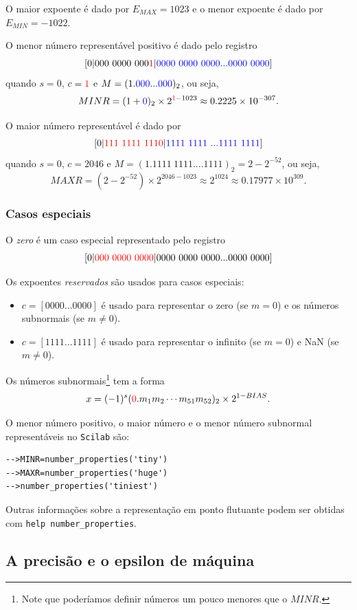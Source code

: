 O maior expoente é dado por $E_{MAX}=1023$ e o menor expoente é dado por $E_{MIN}=-1022$.



O menor número representável positivo é dado pelo registro
$$
[0|000~0000~000{\color{red}{1}} |{\color{blue}{0000~0000~0000...0000~0000}}]
$$
quando $s=0$, $c={\color{red}{1}}$ e $M=(1.{\color{blue}{000...000}})_2$, ou seja,
$$
MINR=(1+{\color{blue}{0}})_2\times 2^{{\color{red}{1}}-1023} \approx 0.2225\times 10^{-307}.
$$

O maior número representável é dado por
$$
[0|{\color{red}{111~1111~1110}} |{\color{blue}{1111~1111~...1111~1111}}]
$$
quando $s=0$, $c=2046$ e $M=(1.1111~1111....1111)_2=2-2^{-52}$, ou seja,
$$
MAXR=(2-2^{-52})\times 2^{2046-1023} \approx 2^{1024}\approx0.17977\times 10^{309}.
$$


\subsubsection{Casos especiais}
O \emph{zero} é um caso especial representado pelo registro 
$$
[0|{\color{red}{000~0000~0000}} |0000~0000~0000...0000~0000]
$$




Os expoentes \emph{reservados} são usados para casos especiais:
\begin{itemize}
 \item $c=[0000...0000]$ é usado para representar o zero (se $m=0$) e os números subnormais (se $m\neq 0$).
 \item $c=[1111...1111]$ é usado para representar o infinito (se $m=0$) e NaN (se $m\neq 0$).
\end{itemize}

Os números subnormais\footnote{Note que poderíamos definir números um pouco menores que o $MINR$.} tem a forma
$$ x=(-1)^{s}({\color{red}{0}}.m_{1}m_{2}\cdots m_{51}m_{52})_2 \times 2^{1-BIAS}.$$

\ifisscilab
\begin{obs}
  O menor número positivo, o maior número e o menor número subnormal representáveis  no \verb+Scilab+ são:
\begin{verbatim}
-->MINR=number_properties('tiny')
-->MAXR=number_properties('huge')
-->number_properties('tiniest')
\end{verbatim}
Outras informações sobre a representação em ponto flutuante podem ser obtidas com \verb+help number_properties+.
\end{obs}
\fi

\subsection{A precisão e o epsilon de máquina}

